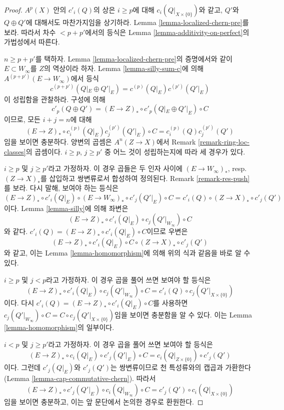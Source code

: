 \begin{proof}
$A^p(X)$ 안의 $c'_i(Q)$의 상은 $i \geq p$에 대해
$c_i(Q|_{X \times \{0\}})$와 같고, $Q'$와 $Q \oplus Q'$에 대해서도
마찬가지임을 상기하라. Lemma \ref{lemma-localized-chern-pre}를 보라.
따라서 차수 $< p + p'$에서의 등식은 Lemma
\ref{lemma-additivity-on-perfect}의 가법성에서 따른다.

\medskip\noindent
$n \geq p + p'$를 택하자. Lemma \ref{lemma-localized-chern-pre}의
증명에서와 같이 $E \subset W_\infty$를 $Z$의 역상이라 하자. Lemma
\ref{lemma-silly-sum-c}에 의해 $A^{(p + p')}(E \to W_\infty)$에서 등식
$$
c^{(p + p')}(Q|_E \oplus Q'|_E) =
c^{(p)}(Q|_E)c^{(p')}(Q'|_E)
$$
이 성립함을 관찰하라. 구성에 의해
$$
c'_p(Q \oplus Q') = (E \to Z)_* \circ c'_p(Q|_E \oplus Q'|_E) \circ C
$$
이므로, 모든 $i + j = n$에 대해
$$
(E \to Z)_* \circ c^{(p)}_i(Q|_E)c^{(p')}_j(Q'|_E) \circ C
=
c^{(p)}_i(Q)c^{(p')}_j(Q')
$$
임을 보이면 충분하다. 양변의 곱셈은 $A^n(Z \to X)$에서 Remark
\ref{remark-ring-loc-classes}의 곱셈이다. $i \geq p$, $j \geq p'$ 중
어느 것이 성립하는지에 따라 세 경우가 있다.

\medskip\noindent
$i \geq p$ 및 $j \geq p'$라고 가정하자. 이 경우 곱들은 두 인자 사이에
$(E \to W_\infty)_*$, resp.\ $(Z \to X)_*$를 삽입하고 쌍변류로서
합성하여 정의된다. Remark \ref{remark-res-push}를 보라. 다시 말해,
보여야 하는 등식은
$$
(E \to Z)_* \circ c'_i(Q|_E) \circ
(E \to W_\infty)_* \circ c'_j(Q'|_E) \circ C =
c'_i(Q) \circ (Z \to X)_* \circ c'_j(Q')
$$
이다. Lemma \ref{lemma-silly}에 의해 좌변은
$$
(E \to Z)_* \circ c'_i(Q|_E) \circ c_j(Q'|_{W_\infty}) \circ C
$$
와 같다. $c'_i(Q) = (E \to Z)_* \circ c'_i(Q|_E) \circ C$이므로 우변은
$$
(E \to Z)_* \circ c'_i(Q|_E) \circ C \circ (Z \to X)_* \circ c'_j(Q')
$$
와 같고, 이는 Lemma \ref{lemma-homomorphism}에 의해 위의 식과 같음을
바로 알 수 있다.

\medskip\noindent
$i \geq p$ 및 $j < p$라고 가정하자. 이 경우 곱을 풀어 쓰면 보여야 할
등식은
$$
(E \to Z)_* \circ c'_i(Q|_E) \circ c_j(Q'|_{W_\infty}) \circ C =
c'_i(Q) \circ c_j(Q'|_{X \times \{0\}})
$$
이다. 다시 $c'_i(Q) = (E \to Z)_* \circ c'_i(Q|_E) \circ C$를 사용하면
$c_j(Q'|_{W_\infty}) \circ C =
C \circ c_j(Q'|_{X \times \{0\}})$임을 보이면 충분함을 알 수 있다.
이는 Lemma \ref{lemma-homomorphism}의 일부이다.

\medskip\noindent
$i < p$ 및 $j \geq p'$라고 가정하자. 이 경우 곱을 풀어 쓰면 보여야 할
등식은
$$
(E \to Z)_* \circ c_i(Q|_E) \circ c'_j(Q'|_E) \circ C =
c_i(Q|_{Z \times \{0\}}) \circ c'_j(Q')
$$
이다. 그런데 $c'_j(Q|_E)$와 $c'_j(Q')$는 쌍변류이므로 천 특성류와의
캡곱과 가환한다(Lemma \ref{lemma-cap-commutative-chern}). 따라서
$$
(E \to Z)_* \circ c'_j(Q'|_E) \circ c_i(Q|_{W_\infty}) \circ C =
c'_j(Q') \circ c_i(Q|_{X \times \{0\}})
$$
임을 보이면 충분하고, 이는 앞 문단에서 논의한 경우로 환원한다.
\end{proof}

